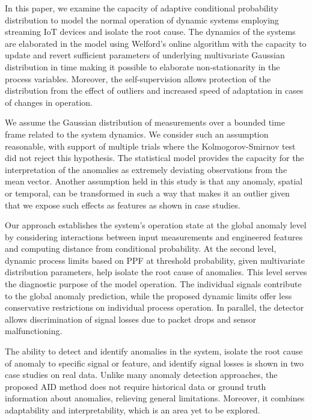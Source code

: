 In this paper, we examine the capacity of adaptive conditional probability distribution to model the normal operation of dynamic systems employing streaming IoT devices and isolate the root cause. The dynamics of the systems are elaborated in the model using Welford's online algorithm with the capacity to update and revert sufficient parameters of underlying multivariate Gaussian distribution in time making it possible to elaborate non-stationarity in the process variables. Moreover, the self-supervision allows protection of the distribution from the effect of outliers and increased speed of adaptation in cases of changes in operation.

We assume the Gaussian distribution of measurements over a bounded time frame related to the system dynamics. We consider such an assumption reasonable, with support of multiple trials where the Kolmogorov-Smirnov test did not reject this hypothesis. The statistical model provides the capacity for the interpretation of the anomalies as extremely deviating observations from the mean vector. Another assumption held in this study is that any anomaly, spatial or temporal, can be transformed in such a way that makes it an outlier given that we expose such effects as features as shown in case studies.

Our approach establishes the system's operation state at the global anomaly level by considering interactions between input measurements and engineered features and computing distance from conditional probability. At the second level, dynamic process limits based on PPF at threshold probability, given multivariate distribution parameters, help isolate the root cause of anomalies. This level serves the diagnostic purpose of the model operation. The individual signals contribute to the global anomaly prediction, while the proposed dynamic limits offer less conservative restrictions on individual process operation. In parallel, the detector allows discrimination of signal losses due to packet drops and sensor malfunctioning.

The ability to detect and identify anomalies in the system, isolate the root cause of anomaly to specific signal or feature, and identify signal losses is shown in two case studies on real data. Unlike many anomaly detection approaches, the proposed AID method does not require historical data or ground truth information about anomalies, relieving general limitations. Moreover, it combines adaptability and interpretability, which is an area yet to be explored.

